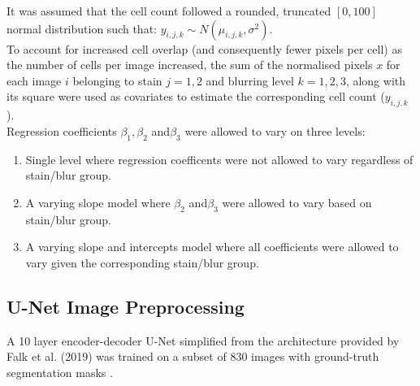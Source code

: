 \documentclass[isoft]{poster_class_UofC}
\begin{document}
\begin{poster}
It was assumed that the cell count followed a rounded, truncated $[0,100]$ normal distribution such that: $y_{i,j,k} \sim N(\mu_{i,j,k}, \sigma^2)$. \\

To account for increased cell overlap (and consequently fewer pixels per cell) as the number of cells per image increased, the sum of the normalised pixels $x$ for each image $i$ belonging to stain $j = 1,2$ and blurring level $k=1,2,3$, along with its square were used as covariates to estimate the corresponding cell count ($y_{i,j,k}$).\\

Regression coefficients $\beta_1, \beta_2$ and$\beta_3$ were allowed to vary on three levels: 
\begin{adjustwidth}{2cm}{}
\begin{enumerate}
 \item Single level where regression coefficents were not allowed to vary regardless of stain/blur group.
 \item A varying slope model where $\beta_2 $ and$\beta_3$ were allowed to vary based on stain/blur group.
 \item A varying slope and intercepts model where all coefficients were allowed to vary given the corresponding stain/blur group.
\end{enumerate} 
\end{adjustwidth}
     

        \subsection{U-Net Image Preprocessing}
A 10 layer encoder-decoder U-Net simplified from the architecture provided by 
Falk et al. (2019) \cite{FalkThorsten2019Udlf} was trained on a subset of 830 images with ground-truth segmentation masks \cite{VebjornLjosa2012Ahmi}.


\end{poster}
\end{document}
